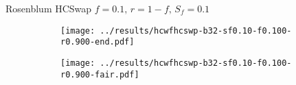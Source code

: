 \documentclass[10pt,a4paper]{beamer}
\begin{document}
%		
	
	\begin{frame}{Rosenblum HCSwap $f=0.1,\, r=1-f,\,S_f=0.1$}
		\begin{figure}
			\begin{subfigure}{.48\textwidth}
				\centering
				\texttt{[image: ../results/hcwfhcswp-b32-sf0.10-f0.100-r0.900-end.pdf]}
			\end{subfigure}
			\begin{subfigure}{.48\textwidth}
				\centering
				\texttt{[image: ../results/hcwfhcswp-b32-sf0.10-f0.100-r0.900-fair.pdf]}
			\end{subfigure}
		\end{figure}
	\end{frame}
	
	
\end{document}
